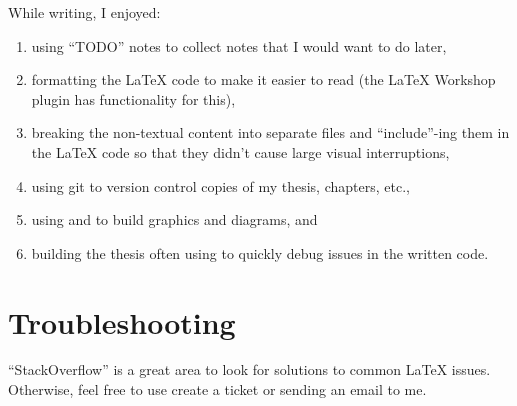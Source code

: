 While writing, I enjoyed:

\begin{enumerate}
    \item using ``TODO'' notes to collect notes that
          I would want to do later,
    \item formatting the \LaTeX{} code to make it easier to read (the \LaTeX{}
          Workshop plugin has functionality for this),
    \item breaking the non-textual content into separate files and
          ``include''-ing them in the \LaTeX{} code so that they didn't cause
          large visual interruptions,
    \item using git to version control copies of my thesis, chapters, etc.,
    \item using  and
           to build
          graphics and diagrams, and
    \item building the thesis often using  to
          quickly debug issues in the written code.
\end{enumerate}

\section{Troubleshooting}
\label{chap:introduction:sec:troubleshooting}

``StackOverflow'' is a great area to look for solutions to common \LaTeX{}
issues. Otherwise, feel free to use create a ticket or sending an email to me.
